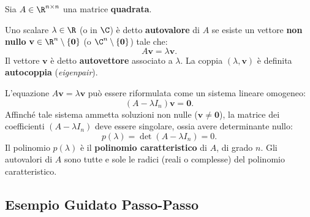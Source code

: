 Sia $A \in \R^{n \times n}$ una matrice \textbf{quadrata}.

\begin{definition}
\label{def:autovalore-autovettore}
Uno scalare $\lambda \in \R$ (o in $\C$) \`e detto \textbf{autovalore} di $A$ se esiste un vettore \textbf{non nullo} $\mathbf{v} \in \R^n \setminus \{\mathbf{0}\}$ (o $\C^n \setminus \{\mathbf{0}\}$) tale che:
\begin{equation}
    A\mathbf{v} = \lambda \mathbf{v}.
\end{equation}
Il vettore $\mathbf{v}$ \`e detto \textbf{autovettore} associato a $\lambda$. La coppia $(\lambda, \mathbf{v})$ \`e definita \textbf{autocoppia} (\textit{eigenpair}).
\end{definition}

L'equazione $A\mathbf{v} = \lambda \mathbf{v}$ pu\`o essere riformulata come un sistema lineare omogeneo:
\begin{equation}
    (A - \lambda I_n)\mathbf{v} = \mathbf{0}.
\end{equation}
Affinch\'e tale sistema ammetta soluzioni non nulle ($\mathbf{v} \neq \mathbf{0}$), la matrice dei coefficienti $(A - \lambda I_n)$ deve essere singolare, ossia avere determinante nullo:
\begin{equation}
    p(\lambda) = \det(A - \lambda I_n) = 0.
\end{equation}
Il polinomio $p(\lambda)$ \`e il \textbf{polinomio caratteristico} di $A$, di grado $n$. Gli autovalori di $A$ sono tutte e sole le radici (reali o complesse) del polinomio caratteristico.

\subsection{Esempio Guidato Passo-Passo}

